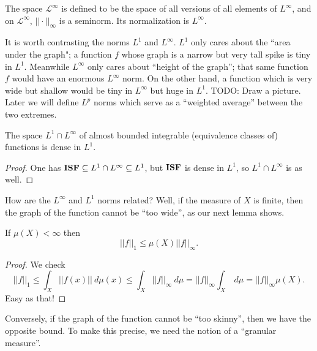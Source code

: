 \begin{subsec}
The space $\mathcal L^\infty$ is defined to be the space of all versions of all elements of $L^\infty$, and on $\mathcal L^\infty$, $||\cdot||_\infty$ is a seminorm. Its normalization is $L^\infty$.
\end{subsec}

\begin{subsec}
It is worth contrasting the norms $L^1$ and $L^\infty$. $L^1$ only cares about the ``area under the graph"; a function $f$ whose graph is a narrow but very tall spike is tiny in $L^1$. Meanwhile $L^\infty$ only cares about ``height of the graph''; that same function $f$ would have an enormous $L^\infty$ norm.
On the other hand, a function which is very wide but shallow would be tiny in $L^\infty$ but huge in $L^1$. TODO: Draw a picture.
Later we will define $L^p$ norms which serve as a ``weighted average'' between the two extremes.
\end{subsec}

\begin{lemma}
The space $L^1 \cap L^\infty$ of almost bounded integrable (equivalence classes of) functions is dense in $L^1$.
\end{lemma}
\begin{proof}
One has $\mathbf{ISF} \subseteq L^1 \cap L^{\infty} \subseteq L^1$, but $\mathbf{ISF}$ is dense in $L^1$, so $L^1 \cap L^\infty$ is as well.
\end{proof}

\begin{subsec}
How are the $L^\infty$ and $L^1$ norms related?
Well, if the measure of $X$ is finite, then the graph of the function cannot be ``too wide'', as our next lemma shows.
\end{subsec}

\begin{lemma}
If $\mu(X) < \infty$ then
\[||f||_1 \leq \mu(X) ||f||_\infty.\]
\end{lemma}
\begin{proof}
We check
\[||f||_1 \leq \int_{X} ||f(x)||~d\mu(x) \leq \int_{X} ||f||_{\infty} ~d\mu = ||f||_{\infty} \int_{X} ~d\mu = ||f||_{\infty} \mu(X).\]
Easy as that!
\end{proof}

\begin{subsec}
Conversely, if the graph of the function cannot be ``too skinny'', then we have the opposite bound.
To make this precise, we need the notion of a ``granular measure''.
\end{subsec}

